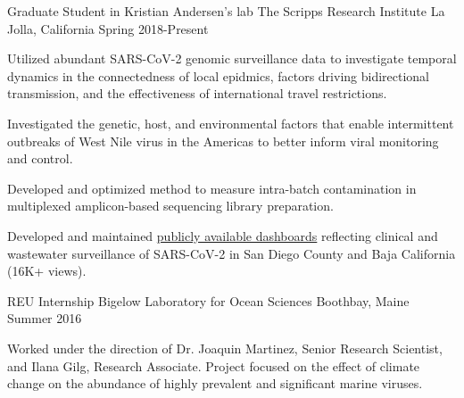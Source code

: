 
\begin{cventries}

  \cventry
    {Graduate Student in Kristian Andersen's lab} %
    {The Scripps Research Institute} %
    {La Jolla, California} %
    {Spring 2018-Present} %
    {
      \begin{cvitems} %
        \item {Utilized abundant SARS-CoV-2 genomic surveillance data to investigate temporal dynamics in the connectedness of local epidmics, factors driving bidirectional transmission, and the effectiveness of international travel restrictions.}
        \item {Investigated the genetic, host, and environmental factors that enable intermittent outbreaks of West Nile virus in the Americas to better inform viral monitoring and control.}
        \item {Developed and optimized method to measure intra-batch contamination in multiplexed amplicon-based sequencing library preparation.}
        \item {Developed and maintained \href{https://searchcovid.info/Dashboards/}{publicly available dashboards} reflecting clinical and wastewater surveillance of SARS-CoV-2 in San Diego County and Baja California (16K+ views).}
      \end{cvitems}
    }

  \cventry
    {REU Internship} %
    {Bigelow Laboratory for Ocean Sciences} %
    {Boothbay, Maine} %
    {Summer 2016} %
    {
      \begin{cvitems}
        \item{
          Worked under the direction of Dr. Joaquin Martinez, Senior Research Scientist, and Ilana Gilg, Research Associate.
          Project focused on the effect of climate change on the abundance of highly prevalent and significant marine viruses.
        }
      \end{cvitems}
    }


\end{cventries}

